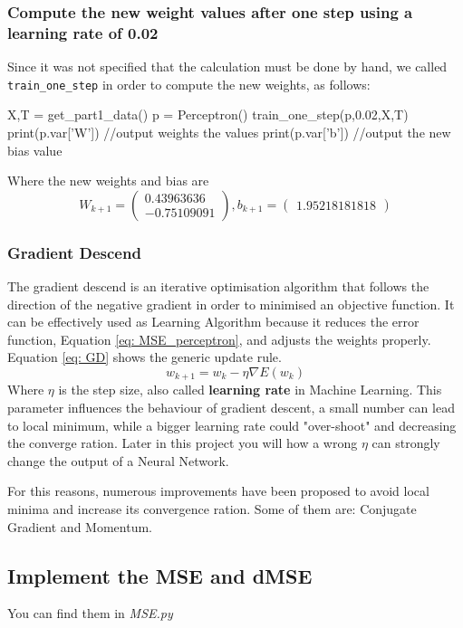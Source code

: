 \documentclass[11pt]{article}
\begin{document}
\subsubsection{Compute the new weight values after one step using a learning rate of 0.02}
Since it was not specified that the calculation must be done by hand, we called \texttt{train\_one\_step} in order to compute the new weights, as follows:
\begin{python}
X,T = get_part1_data()
p = Perceptron()
train_one_step(p,0.02,X,T)
print(p.var['W']) //output weights the values	
print(p.var['b']) //output the new bias value
\end{python}
Where the new weights and bias are
$$W_{k + 1} = \begin{pmatrix}
 0.43963636 \\
 -0.75109091
\end{pmatrix}, b_{k+1} = \begin{pmatrix}
	1.95218181818
\end{pmatrix}$$
\subsubsection{Gradient Descend}
The gradient descend is an iterative optimisation algorithm that follows the direction of the negative gradient in order to minimised an objective function. It can be effectively used as Learning Algorithm because it reduces the error function, Equation \ref{eq: MSE_perceptron}, and adjusts the weights properly. Equation \ref{eq: GD} shows the generic update rule.
\begin{equation}
\label{eq: GD}
	w_{k + 1} = w_k - \eta \nabla E(w_k)
\end{equation}
Where $\eta$ is the step size, also called \textbf{learning rate} in Machine Learning. This parameter influences the behaviour of gradient descent, a small number can lead to local minimum, while a bigger learning rate could "over-shoot" and decreasing the converge ration. Later in this project you will how a wrong $\eta$ can strongly change the output of a Neural Network.

For this reasons, numerous improvements have been proposed to avoid local minima and increase its convergence ration. Some of them are: Conjugate Gradient and Momentum.
\subsection{Implement the MSE and dMSE}
You can find them in \emph{MSE.py}
\end{document}
